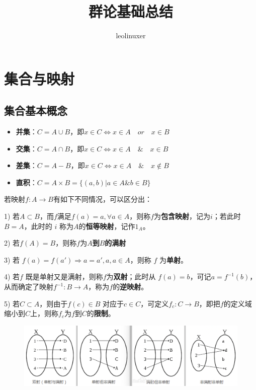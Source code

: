 \documentclass[12pt]{article}
\title{群论基础总结\cite{From_Linear_Equation_To_Galois_Theory}\cite{Visual_Group_Theory}}
\author{leolinuxer}
\begin{document}
\maketitle
\tableofcontents

\section{集合与映射}
\subsection{集合基本概念}
\begin{itemize}
\setlength{\itemsep}{0pt}
\setlength{\parsep}{0pt}
\setlength{\parskip}{0pt}
    \item \textbf{并集}：$C = A\cup B$，即$x\in C \Leftrightarrow x\in A \quad or \quad x \in B$
    \item \textbf{交集}：$C = A \cap B$，即$x\in C \Leftrightarrow x\in A \quad \& \quad x \in B$
    \item \textbf{差集}：$C = A - B$，即$x\in C \Leftrightarrow x\in A \quad \& \quad x \notin B$
    \item \textbf{直积}：$C = A \times B = \{(a,b)|a\in A \& b \in B\}$
\end{itemize}

若映射$f: A \rightarrow B$有如下不同情况，可以区分出：

1) 若$A \subset B$，而$f$满足$f(a) = a, \forall a \in A$，则称$f$为\textbf{包含映射}，记为$i$；若此时 $B=A$，此时的 $i$ 称为$A$的\textbf{恒等映射}，记作$1_A$。

2) 若$f(A) = B$，则称$f$为\textbf{$A$到$B$的满射}

3) 若 $f(a) = f(a') \Rightarrow a = a', a,a \in A$，则称 $f$ 为\textbf{单射}。

4) 若$f$ 既是单射又是满射，则称$f$为\textbf{双射}；此时从 $f(a) = b$，可记$a = f^{-1}(b)$，从而确定了映射$f^{-1}: B \rightarrow A$，称为$f$的\textbf{逆映射}。

5) 若$C \subset A$，则由于$f(c) \in B$ 对应于$c \in C$，可定义$f_c: C \rightarrow B$，即把$f$的定义域缩小到$C$上，则称$f_c$为$f$到$C$的\textbf{限制}。
\begin{figure}[H]
    \centering
    \includegraphics[width=.8\textwidth]{fig/SetMappingClassification.png}
\end{figure}
\end{document}
